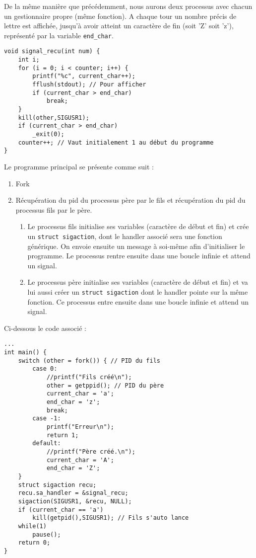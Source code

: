\medskip

De la même manière que précédemment, nous aurons deux processus avec chacun un gestionnaire propre (même fonction). A chaque tour un nombre précis de lettre est affichée, jusqu'à avoir atteint un caractère de fin (soit 'Z' soit 'z'), représenté par la variable \lstinline{end_char}.
\begin{lstlisting}
void signal_recu(int num) {
    int i;
    for (i = 0; i < counter; i++) {
        printf("%c", current_char++);
        fflush(stdout); // Pour afficher
        if (current_char > end_char)
            break;
    }
    kill(other,SIGUSR1);
    if (current_char > end_char)
        _exit(0);
    counter++; // Vaut initialement 1 au début du programme
}
\end{lstlisting}

\noindent Le programme principal se présente comme suit :
\begin{enumerate}
  \item Fork
  \item Récupération du pid du processus père par le fils et récupération du pid du processus fils par le père.
  \begin{enumerate}
    \item Le processus fils initialise ses variables (caractère de début et fin) et crée un \lstinline{struct sigaction}, dont le handler associé sera une fonction générique. On envoie ensuite un message à soi-même afin d'initialiser le programme.
Le processus rentre ensuite dans une boucle infinie et attend un signal.
    \item Le processus père initialise ses variables (caractère de début et fin) et  va lui aussi créer un \lstinline{struct sigaction} dont le handler pointe sur la même fonction. Ce processus entre ensuite dans une boucle infinie et attend un signal.
  \end{enumerate}
\end{enumerate}

\noindent Ci-dessous le code associé :
\begin{lstlisting}
...
int main() {
    switch (other = fork()) { // PID du fils
        case 0:
            //printf("Fils créé\n");
            other = getppid(); // PID du père
            current_char = 'a';
            end_char = 'z';
            break;
        case -1:
            printf("Erreur\n");
            return 1;
        default:
            //printf("Père créé.\n");
            current_char = 'A';
            end_char = 'Z';
    }
    struct sigaction recu;
    recu.sa_handler = &signal_recu;
    sigaction(SIGUSR1, &recu, NULL);
    if (current_char == 'a')
        kill(getpid(),SIGUSR1); // Fils s'auto lance
    while(1)
        pause();
    return 0;
}
\end{lstlisting}

